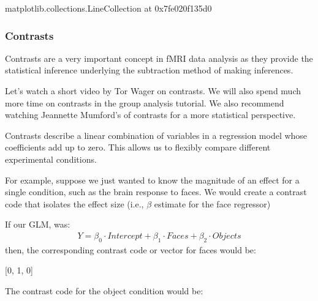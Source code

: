\documentclass[letterpaper,10pt,english]{sphinxmanual}
\begin{document}
\begin{sphinxVerbatim}[commandchars=\\\{\}]
\PYGZlt{}matplotlib.collections.LineCollection at 0x7fe020f135d0\PYGZgt{}
\end{sphinxVerbatim}

\noindent{}


\subsubsection{Contrasts}
\label{\detokenize{content/GLM:contrasts}}
Contrasts are a very important concept in fMRI data analysis as they provide the statistical inference underlying the subtraction method of making inferences.

Let’s watch a short video by Tor Wager on contrasts. We will also spend much more time on contrasts in the group analysis tutorial. We also recommend watching Jeannette Mumford’s  of contrasts for a more statistical perspective.

\begin{sphinxVerbatim}[commandchars=\\\{\}]
\end{sphinxVerbatim}

\noindent{}

Contrasts describe a linear combination of variables in a regression model whose coefficients add up to zero. This allows us to flexibly compare different experimental conditions.

For example, suppose we just wanted to know the magnitude of an effect for a single condition, such as the brain response to faces. We would create a contrast code that isolates the effect size (i.e., \(\beta\) estimate for the face regressor)

If our GLM, was:
\begin{equation*}
\begin{split}Y = \beta_0 \cdot Intercept + \beta_1 \cdot Faces + \beta_2 \cdot Objects\end{split}
\end{equation*}
then, the corresponding contrast code or vector for faces would be:

{[}0, 1, 0{]}

The contrast code for the object condition would be:
\end{document}
